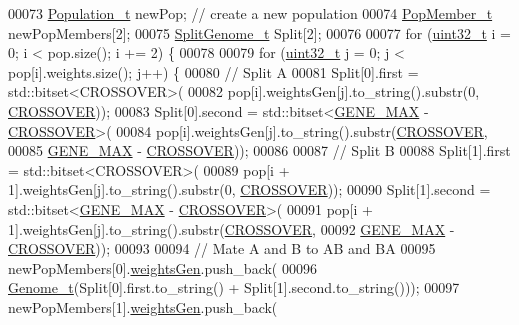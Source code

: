 \begin{DoxyCode}
00073   \hyperlink{_soil_math_types_8h_a8d2d4c736cf817d048a2d66dec8b12ec}{Population\_t} newPop; \textcolor{comment}{// create a new population}
00074   \hyperlink{struct_pop_member_struct}{PopMember\_t} newPopMembers[2];
00075   \hyperlink{_soil_math_types_8h_a44bbe64bbeb237fd8918433d5f6f85b7}{SplitGenome\_t} Split[2];
00076 
00077   \textcolor{keywordflow}{for} (\hyperlink{_soil_math_types_8h_a435d1572bf3f880d55459d9805097f62}{uint32\_t} i = 0; i < pop.size(); i += 2) \{
00078 
00079     \textcolor{keywordflow}{for} (\hyperlink{_soil_math_types_8h_a435d1572bf3f880d55459d9805097f62}{uint32\_t} j = 0; j < pop[i].weights.size(); j++) \{
00080       \textcolor{comment}{// Split A}
00081       Split[0].first = std::bitset<CROSSOVER>(
00082           pop[i].weightsGen[j].to\_string().substr(0, \hyperlink{_soil_math_types_8h_ae84e527452fcf9dfc8ef8fd0dd5cd598}{CROSSOVER}));
00083       Split[0].second = std::bitset<\hyperlink{_soil_math_types_8h_aa5e1eb1a998e5ed69af2076cf318df4b}{GENE\_MAX} - \hyperlink{_soil_math_types_8h_ae84e527452fcf9dfc8ef8fd0dd5cd598}{CROSSOVER}>(
00084           pop[i].weightsGen[j].to\_string().substr(\hyperlink{_soil_math_types_8h_ae84e527452fcf9dfc8ef8fd0dd5cd598}{CROSSOVER},
00085                                                   \hyperlink{_soil_math_types_8h_aa5e1eb1a998e5ed69af2076cf318df4b}{GENE\_MAX} - \hyperlink{_soil_math_types_8h_ae84e527452fcf9dfc8ef8fd0dd5cd598}{CROSSOVER}));
00086 
00087       \textcolor{comment}{// Split B}
00088       Split[1].first = std::bitset<CROSSOVER>(
00089           pop[i + 1].weightsGen[j].to\_string().substr(0, \hyperlink{_soil_math_types_8h_ae84e527452fcf9dfc8ef8fd0dd5cd598}{CROSSOVER}));
00090       Split[1].second = std::bitset<\hyperlink{_soil_math_types_8h_aa5e1eb1a998e5ed69af2076cf318df4b}{GENE\_MAX} - \hyperlink{_soil_math_types_8h_ae84e527452fcf9dfc8ef8fd0dd5cd598}{CROSSOVER}>(
00091           pop[i + 1].weightsGen[j].to\_string().substr(\hyperlink{_soil_math_types_8h_ae84e527452fcf9dfc8ef8fd0dd5cd598}{CROSSOVER},
00092                                                       \hyperlink{_soil_math_types_8h_aa5e1eb1a998e5ed69af2076cf318df4b}{GENE\_MAX} - 
      \hyperlink{_soil_math_types_8h_ae84e527452fcf9dfc8ef8fd0dd5cd598}{CROSSOVER}));
00093 
00094       \textcolor{comment}{// Mate A and B to AB and BA}
00095       newPopMembers[0].\hyperlink{struct_pop_member_struct_a072fadb4863e0cf77b55ad3b46b62522}{weightsGen}.push\_back(
00096           \hyperlink{_soil_math_types_8h_a58f6ab36d2cb0527a73caec36d14a0e0}{Genome\_t}(Split[0].first.to\_string() + Split[1].second.to\_string()));
00097       newPopMembers[1].\hyperlink{struct_pop_member_struct_a072fadb4863e0cf77b55ad3b46b62522}{weightsGen}.push\_back(

\end{DoxyCode}
